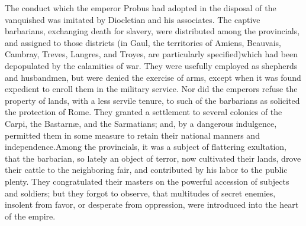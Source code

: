 

The conduct which the emperor Probus had adopted in the disposal
of the vanquished was imitated by Diocletian and his associates.
The captive barbarians, exchanging death for slavery, were
distributed among the provincials, and assigned to those
districts (in Gaul, the territories of Amiens, Beauvais, Cambray,
Treves, Langres, and Troyes, are particularly specified)\footnotemark[37] which
had been depopulated by the calamities of war. They were usefully
employed as shepherds and husbandmen, but were denied the
exercise of arms, except when it was found expedient to enroll
them in the military service. Nor did the emperors refuse the
property of lands, with a less servile tenure, to such of the
barbarians as solicited the protection of Rome. They granted a
settlement to several colonies of the Carpi, the Bastarnæ, and
the Sarmatians; and, by a dangerous indulgence, permitted them in
some measure to retain their national manners and independence.\footnotemark[38]
Among the provincials, it was a subject of flattering
exultation, that the barbarian, so lately an object of terror,
now cultivated their lands, drove their cattle to the neighboring
fair, and contributed by his labor to the public plenty. They
congratulated their masters on the powerful accession of subjects
and soldiers; but they forgot to observe, that multitudes of
secret enemies, insolent from favor, or desperate from
oppression, were introduced into the heart of the empire.\footnotemark[39]




